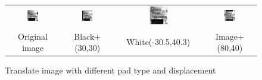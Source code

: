 \documentclass[11pt,a4paper]{article}
\begin{document}
\begin{figure}[!htbp]
	\centering
	\begin{tabular}{cccc} 
		\includegraphics[width=0.23\textwidth]{pro6/translate/originTrans}&
		\includegraphics[width=0.23\textwidth]{pro6/translate/trans_30_30_black}&
		\includegraphics[width=0.23\textwidth]{pro6/translate/trans_-30_5_40_3_white}&
		\includegraphics[width=0.23\textwidth]{pro6/translate/trans_80_40_image}\\
		Original image & Black+(30,30)&White(-30.5,40.3) & Image+(80,40)
	\end{tabular}
	\caption{Translate image with different pad type and displacement}
	\label{pro6_fig4}
\end{figure}
\end{document}
